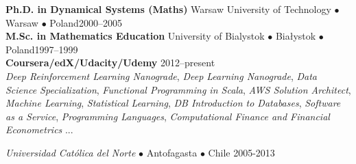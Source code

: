 \documentclass[a4paper, oneside]{scrreprt}
\begin{document}
  
\vspace{-0.1cm}

\noindent\makebox[\linewidth]{\rule{\textwidth}{0.4pt}}


\vspace{0.2cm}

\noindent\textbf{Ph.D. in Dynamical Systems (Maths)} Warsaw University of Technology $\bullet$ Warsaw $\bullet$ Poland\hfill 2000--2005\\
\noindent\textbf{M.Sc. in Mathematics Education} University of Bialystok $\bullet$ Białystok $\bullet$ Poland\hfill 1997--1999\\
\noindent\textbf{Coursera/edX/Udacity/Udemy} \hfill 2012--present\\
\emph{Deep Reinforcement Learning Nanograde}, 
\emph{Deep Learning Nanograde}, \emph{Data Science Specialization}, \emph{Functional Programming in Scala}, 
\emph{AWS Solution Architect},
\emph{Machine Learning},  \emph{Statistical Learning}, 
\emph{DB Introduction to Databases}, \emph{Software as a Service}, 
\emph{Programming Languages}, 
\emph{Computational Finance and Financial Econometrics} ... \\
\noindent\makebox[\linewidth]{\rule{\textwidth}{0.4pt}}

\vspace{0.2cm}





\noindent{}\textit{Universidad Católica del Norte} $\bullet$ 
Antofagasta $\bullet$ Chile \hfill 2005-2013\\
\\
\end{document}

